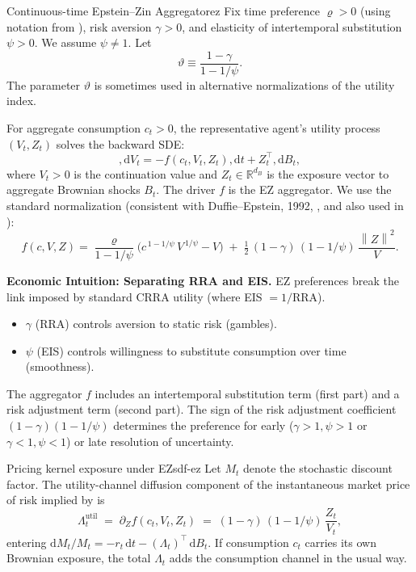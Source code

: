 \documentclass[11pt,letterpaper,oneside]{article}
\numberwithin{equation}{section}
\newcommand{\1}{\mathbf{1}}
\newcommand{\diff}{,\mathrm{d}}
\newcommand{\norm}[1]{\left\lVert #1\right\rVert}
\begin{document}
\begin{definition}{Continuous-time Epstein--Zin Aggregator}{ez}
Fix time preference $\varrho>0$ (using notation from ), risk aversion $\gamma>0$, and elasticity of intertemporal substitution $\psi>0$. We assume $\psi\neq 1$. Let
\[
\vartheta \equiv \frac{1-\gamma}{1-1/\psi}.
\]
The parameter $\vartheta$ is sometimes used in alternative normalizations of the utility index.

For aggregate consumption $c_t>0$, the representative agent's utility process $(V_t, Z_t)$ solves the backward SDE:
\[
\diff V_t = -f(c_t, V_t, Z_t)\diff t + Z_t^\top \diff B_t,
\]
where $V_t>0$ is the continuation value and $Z_t\in\mathbb{R}^{d_B}$ is the exposure vector to aggregate Brownian shocks $B_t$. The driver $f$ is the EZ aggregator. We use the standard normalization (consistent with Duffie--Epstein, 1992, \cite{duffie_epstein_1992}, and also used in \cite{Sauzet2023}):
\begin{equation}\label{eq:ez-agg}
f(c,V,Z)
= \frac{\varrho}{1-1/\psi}\Big( c^{\,1-1/\psi}\,V^{\,1/\psi} - V \Big)
\; +\; \tfrac{1}{2}\,(1-\gamma)\,(1-1/\psi)\,\frac{\norm{Z}^2}{V}.
\end{equation}
\end{definition}

\begin{tcolorbox}[didacticstyle]
\textbf{Economic Intuition: Separating RRA and EIS.}
EZ preferences break the link imposed by standard CRRA utility (where EIS $= 1/\text{RRA}$).
\begin{itemize}[leftmargin=1.15em,itemsep=0.25em]
 \item $\gamma$ (RRA) controls aversion to static risk (gambles).
 \item $\psi$ (EIS) controls willingness to substitute consumption over time (smoothness).
\end{itemize}
The aggregator $f$ includes an intertemporal substitution term (first part) and a risk adjustment term (second part). The sign of the risk adjustment coefficient $(1-\gamma)(1-1/\psi)$ determines the preference for early ($\gamma>1, \psi>1$ or $\gamma<1, \psi<1$) or late resolution of uncertainty.
\end{tcolorbox}

\begin{proposition}{Pricing kernel exposure under EZ}{sdf-ez}
Let $M_t$ denote the stochastic discount factor. The utility-channel diffusion
component of the instantaneous market price of risk implied by
 is
\[
\Lambda^{\mathrm{util}}_t \;=\; \partial_Z f(c_t, V_t, Z_t) \;=\; (1-\gamma)\,(1-1/\psi)\,\frac{Z_t}{V_t},
\]
entering $\mathrm{d}M_t/M_t = -r_t\,\mathrm{d}t - (\Lambda_t)^{\!\top}\,\mathrm{d}B_t$.
If consumption $c_t$ carries its own Brownian exposure, the total $\Lambda_t$ adds
the consumption channel in the usual way.
\end{proposition}
\end{document}
